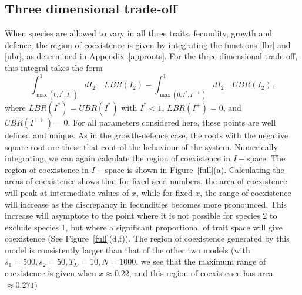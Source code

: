 \subsection{Three dimensional trade-off}
When species are allowed to vary in all three traits, fecundity, growth and defence, the region of coexistence is given by integrating the functions \eqref{lbr} and \eqref{ubr}, as determined in Appendix~\ref{approots}. For the three dimensional trade-off, this integral takes the form
\begin{equation}
\int_{\max(0,I^*,I^+)}^1 dI_2 \quad LBR(I_2) - \int_{\max(0,I^*,I^{++})}^1 dI_2 \quad UBR(I_2),
\end{equation}
where $LBR(I^*)=UBR(I^*)$ with $I^*<1$, $LBR(I^+)=0$, and $UBR(I^{++})=0$. For all parameters considered here, these points are well defined and unique. As in the growth-defence case, the roots with the negative square root are those that control the behaviour of the system. Numerically integrating, we can again calculate the region of coexistence in $I-$space. The region of coexistence in $I-$space is shown in Figure~\ref{full}(a). Calculating the areas of coexistence shows that for fixed seed numbers, the area of coexistence will peak at intermediate values of $x$, while for fixed $x$, the range of coexistence will increase as the discrepancy in fecundities becomes more pronounced. This increase will asymptote to the point where it is not possible for species 2 to exclude species 1, but where a significant proportional of trait space will give coexistence (See Figure~\ref{full}(d,f)). The region of coexistence generated by this model is consistently larger than that of the other two models (with $s_1=500,s_2=50,T_D=10,N=1000$, we see that the maximum range of coexistence is given when $x\approx 0.22$, and this region of coexistence has area $\approx 0.271$)
